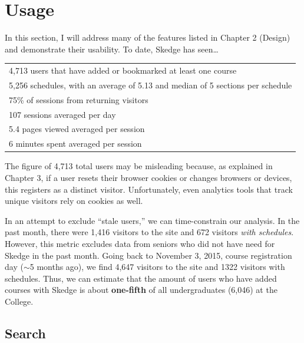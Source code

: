 
\section{Usage}

In this section, I will address many of the features listed in Chapter 2 (Design) and demonstrate their usability. To date, Skedge has seen\ldots

\vspace{5pt}

\begin{center}
\begin{tabular}{l}
  \hline
  4,713 users that have added or bookmarked at least one course \\ 
  5,256 schedules, with an average of 5.13 and median of 5 sections per schedule \\ 
  75\% of sessions from returning visitors \\ 
  107 sessions averaged per day \\ 
  5.4 pages viewed averaged per session  \\ 
  6 minutes spent averaged per session \\ 
  \hline
\end{tabular}
\end{center}

\noindent The figure of 4,713 total users may be misleading because, as explained in Chapter 3, if a user resets their browser cookies or changes browsers or devices, this registers as a distinct visitor. Unfortunately, even analytics tools that track unique visitors rely on cookies as well.

In an attempt to exclude ``stale users,'' we can time-constrain our analysis. In the past month, there were 1,416 visitors to the site and 672 visitors \emph{with schedules}. However, this metric excludes data from seniors who did not have need for Skedge in the past month. Going back to November 3, 2015, course registration day ($\sim$5 months ago), we find 4,647 visitors to the site and 1322 visitors with schedules. Thus, we can estimate that the amount of users who have added courses with Skedge is about \textbf{one-fifth} of all undergraduates (6,046) at the College.

\subsection{Search}

